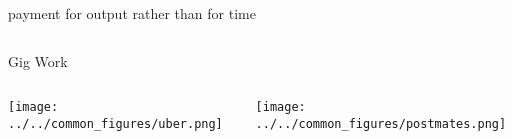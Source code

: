 \documentclass[presentation]{subfiles}
\begin{document}
\begin{frame}[t]{payment for output rather than for time}
{\begin{columns}[b]
      \begin{column}[t]{0.45\textwidth}
        \centering
        Gig Work

        \vspace{0.5em}

        \begin{columns}
          \begin{column}{.5\textwidth}
            \texttt{[image: ../../common\_figures/uber.png]}
          \end{column}
          \begin{column}{.5\textwidth}
            \texttt{[image: ../../common\_figures/postmates.png]}
          \end{column}
        \end{columns}
      \end{column}
    \end{columns}
  }
\end{frame}


\begin{frame} %

      \centering
        
\end{frame}
\end{document}

